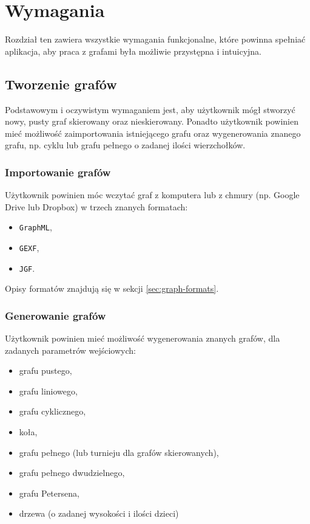 \chapter{Wymagania}

Rozdział ten zawiera wszystkie wymagania funkcjonalne, które powinna spełniać aplikacja, aby praca z grafami była możliwie przystępna i intuicyjna.

\section{Tworzenie grafów}
Podstawowym i oczywistym wymaganiem jest, aby użytkownik mógł stworzyć nowy, pusty graf skierowany oraz nieskierowany. Ponadto użytkownik powinien mieć możliwość zaimportowania istniejącego grafu oraz wygenerowania znanego grafu, np. cyklu lub grafu pełnego o zadanej ilości wierzchołków. 

\subsection{Importowanie grafów} \label{subsec:import}
Użytkownik powinien móc wczytać graf z komputera lub z chmury (np. Google Drive lub Dropbox) w trzech znanych formatach: 

\begin{itemize}
\setlength\itemsep{0em}
\item \texttt{GraphML},
\item \texttt{GEXF},
\item \texttt{JGF}.
\end{itemize}

Opisy formatów znajdują się w sekcji \ref{sec:graph-formats}.

\subsection{Generowanie grafów}

Użytkownik powinien mieć możliwość wygenerowania znanych grafów, dla zadanych parametrów wejściowych:

\begin{itemize}
\setlength\itemsep{0em}
\item grafu pustego,
\item grafu liniowego,
\item grafu cyklicznego,
\item koła,
\item grafu pełnego (lub turnieju dla grafów skierowanych),
\item grafu pełnego dwudzielnego,
\item grafu Petersena,
\item drzewa (o zadanej wysokości i ilości dzieci)
\end{itemize}

